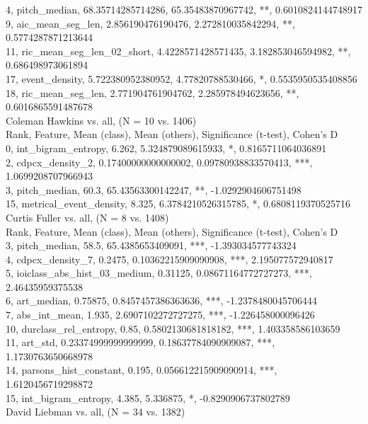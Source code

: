 4, pitch_median, 68.35714285714286, 65.35483870967742, **, 0.6010824144748917\\
9, aic_mean_seg_len, 2.856190476190476, 2.272810035842294, **, 0.5774287871213644\\
11, ric_mean_seg_len_02_short, 4.4228571428571435, 3.182853046594982, **, 0.686498973061894\\
17, event_density, 5.722380952380952, 4.77820788530466, *, 0.5535950535408856\\
18, ric_mean_seg_len, 2.771904761904762, 2.285978494623656, **, 0.6016865591487678\\
Coleman Hawkins vs. all, (N = 10 vs. 1406)\\
Rank, Feature, Mean (class), Mean (others), Significance (t-test), Cohen's D\\
0, int_bigram_entropy, 6.262, 5.324879089615933, *, 0.8165711064036891\\
2, cdpcx_density_2, 0.17400000000000002, 0.09780938833570413, ***, 1.0699208707966943\\
3, pitch_median, 60.3, 65.43563300142247, **, -1.0292904606751498\\
15, metrical_event_density, 8.325, 6.3784210526315785, *, 0.6808119370525716\\
Curtis Fuller vs. all, (N = 8 vs. 1408)\\
Rank, Feature, Mean (class), Mean (others), Significance (t-test), Cohen's D\\
3, pitch_median, 58.5, 65.4385653409091, ***, -1.393034577743324\\
4, cdpcx_density_7, 0.2475, 0.10362215909090908, ***, 2.195077572940817\\
5, ioiclass_abs_hist_03_medium, 0.31125, 0.08671164772727273, ***, 2.46435959375538\\
6, art_median, 0.75875, 0.8457457386363636, ***, -1.2378480045706444\\
7, abs_int_mean, 1.935, 2.6907102272727275, ***, -1.226458000096426\\
10, durclass_rel_entropy, 0.85, 0.5802130681818182, ***, 1.403358586103659\\
11, art_std, 0.23374999999999999, 0.18637784090909087, ***, 1.1730763650668978\\
14, parsons_hist_constant, 0.195, 0.056612215909090914, ***, 1.6120456719298872\\
15, int_bigram_entropy, 4.385, 5.336875, *, -0.8290906737802789\\
David Liebman vs. all, (N = 34 vs. 1382)\\
